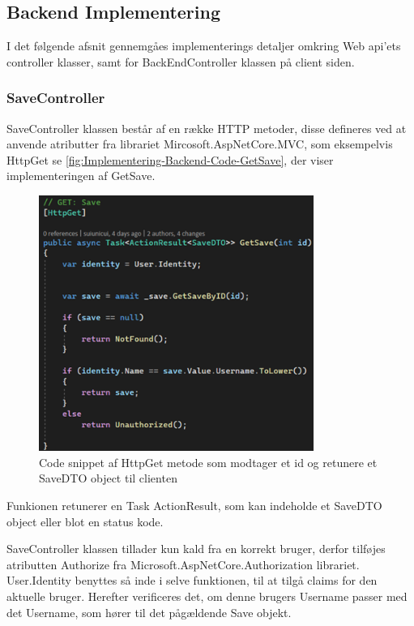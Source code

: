 \subsection{Backend Implementering}

I det følgende afsnit gennemgåes implementerings detaljer omkring Web api'ets controller klasser, samt for BackEndController klassen på client siden.

\subsubsection{SaveController}

SaveController klassen består af en række HTTP metoder, disse defineres ved at anvende atributter fra librariet Mircosoft.AspNetCore.MVC, som eksempelvis HttpGet se \autoref{fig:Implementering-Backend-Code-GetSave}, der viser implementeringen af GetSave.

\begin{figure}[H]
\centering
\includegraphics[width = 0.8\textwidth]{02-Body/Images/Backend_Code_GetSave.PNG}
\caption{Code snippet af HttpGet metode som modtager et id og retunere et SaveDTO object til clienten}
\label{fig:Implementering-Backend-Code-GetSave}
\end{figure}

Funkionen retunerer en Task ActionResult, som kan indeholde et SaveDTO object eller blot en status kode.

SaveController klassen tillader kun kald fra en korrekt bruger, derfor tilføjes atributten Authorize fra Microsoft.AspNetCore.Authorization librariet. User.Identity benyttes så inde i selve funktionen, til at tilgå claims for den aktuelle bruger. Herefter verificeres det, om denne brugers Username passer med det Username, som hører til det pågældende Save objekt.\\  

